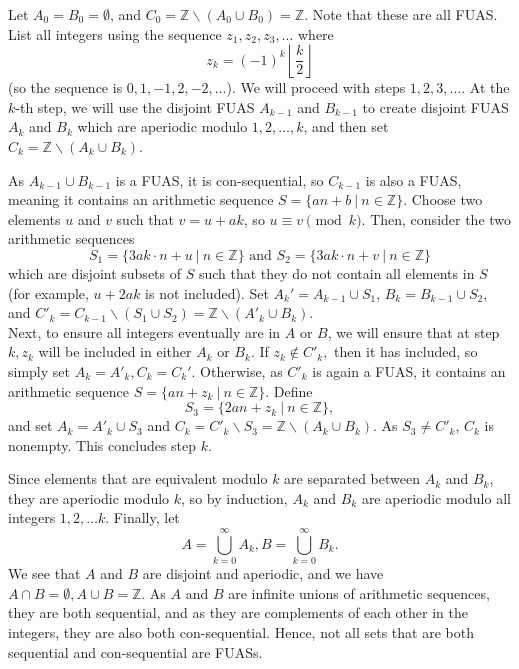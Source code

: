 \documentclass{article}
\begin{document}
    Let $A_0 = B_0 = \emptyset$, and $C_0 = \mathbb{Z}\backslash (A_0\cup B_0) = \mathbb{Z}$. Note that these are all FUAS. List all integers using the sequence $z_1, z_2, z_3, \dots$ where $$z_k = (-1)^k \left\lfloor \frac{k}{2}\right\rfloor$$ (so the sequence is $0, 1, -1, 2, -2, \dots$). We will proceed with steps $1, 2, 3, \dots$. At the $k$-th step, we will use the disjoint FUAS $A_{k - 1}$ and $B_{k - 1}$ to create disjoint FUAS $A_k$ and $B_k$ which are aperiodic modulo $1, 2, \dots, k$, and then set $C_k = \mathbb{Z}\backslash (A_k\cup B_k).$
    
    As $A_{k - 1}\cup B_{k - 1}$ is a FUAS, it is con-sequential, so $C_{k - 1}$ is also a FUAS, meaning it contains an arithmetic sequence $S = \{an + b\ |\ n\in\mathbb{Z}\}$. Choose two elements $u$ and $v$ such that $v = u + ak$, so $u\equiv v\pmod k$. Then, consider the two arithmetic sequences $$S_1 = \{3ak\cdot n + u\ |\ n\in\mathbb{Z}\}\text{ and } S_2 = \{3ak\cdot n + v\ |\ n\in\mathbb{Z}\}$$
    which are disjoint subsets of $S$ such that they do not contain all elements in $S$ (for example, $u + 2ak$ is not included). Set $A_k' = A_{k - 1}\cup S_1$, $B_k = B_{k - 1}\cup S_2$, and $C'_k = C_{k - 1}\backslash (S_1\cup S_2) = \mathbb{Z}\backslash (A'_k\cup B_k)$. \\

    Next, to ensure all integers eventually are in $A$ or $B$, we will ensure that at step $k, z_k$ will be included in either $A_k$ or $B_k$. If $z_k\notin C'_k,$ then it has included, so simply set $A_k = A'_k, C_k = C_k'$. Otherwise, as $C'_k$ is again a FUAS, it contains an arithmetic sequence $S = \{an + z_k\ |\ n\in\mathbb{Z}\}$. Define $$S_3 = \{2an + z_k\ |\ n\in\mathbb{Z}\},$$
    and set $A_k = A'_k\cup S_3$ and $C_k = C'_k\backslash S_3 = \mathbb{Z}\backslash (A_k\cup B_k)$. As $S_3 \neq C'_k$, $C_k$ is nonempty. This concludes step $k$.

    Since elements that are equivalent modulo $k$ are separated between $A_k$ and $B_k$, they are aperiodic modulo $k$, so by induction, $A_k$ and $B_k$ are aperiodic modulo all integers $1, 2, \dots k$. Finally, let $$A = \bigcup_{k = 0}^\infty A_k, B = \bigcup_{k = 0}^\infty B_k.$$
    We see that $A$ and $B$ are disjoint and aperiodic, and we have $A\cap B = \emptyset, A\cup B = \mathbb{Z}$. As $A$ and $B$ are infinite unions of arithmetic sequences, they are both sequential, and as they are complements of each other in the integers, they are also both con-sequential. Hence, not all sets that are both sequential and con-sequential are FUASs.
	
\end{document}

